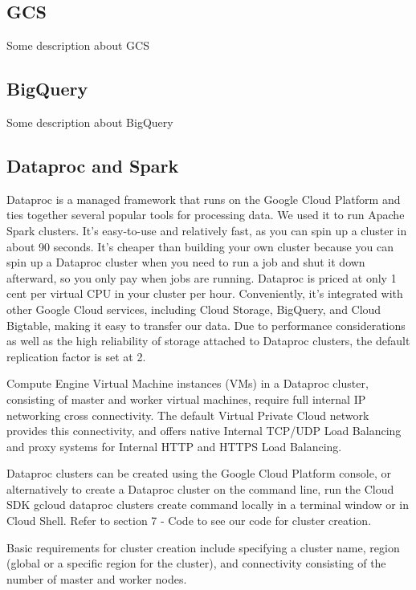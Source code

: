 \documentclass[a4paper,12pt]{article}
\begin{document}
\subsection{GCS}
Some description about GCS

\subsection{BigQuery}
Some description about BigQuery

\subsection{Dataproc and Spark}
\label{sec:spark}

Dataproc is a managed framework that runs on the Google Cloud Platform and ties together several popular tools for processing data. 
We used it to run Apache Spark clusters. It's easy-to-use and relatively fast, as you can spin up a cluster in about 90 seconds.
It’s cheaper than building your own cluster because you can spin up a Dataproc cluster when you need to run a job and
shut it down afterward, so you only pay when jobs are running. Dataproc is priced at only 1 cent per virtual CPU in your
cluster per hour. Conveniently, it’s integrated with other Google Cloud services, including Cloud Storage, BigQuery, and
Cloud Bigtable, making it easy to transfer our data. Due to performance considerations as well as the high reliability of
storage attached to Dataproc clusters, the default replication factor is set at 2.

Compute Engine Virtual Machine instances (VMs) in a Dataproc cluster, consisting of master and worker
virtual machines, require full internal IP networking cross connectivity. The default Virtual Private Cloud network provides
this connectivity, and offers native Internal TCP/UDP Load Balancing and proxy systems for Internal
HTTP and HTTPS Load Balancing.

Dataproc clusters can be created using the Google Cloud Platform console, or alternatively to create a Dataproc cluster
on the command line, run the Cloud SDK gcloud dataproc clusters create command locally in a terminal window or in
Cloud Shell. Refer to section 7 - Code to see our code for cluster creation.

Basic requirements for cluster creation include specifying a cluster name, region (global or a specific region for the cluster), and
connectivity consisting of the number of master and worker nodes.
\end{document}
